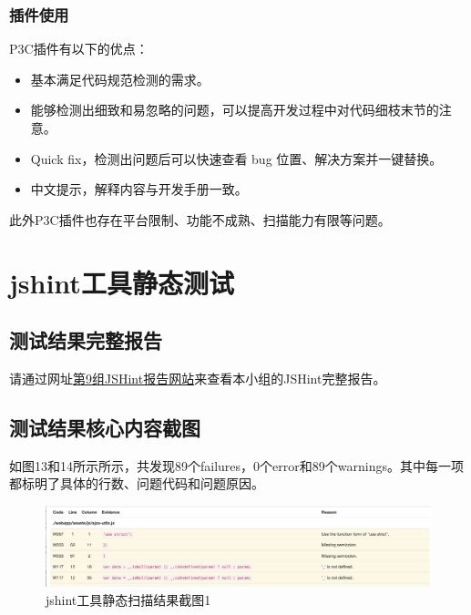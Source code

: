 \documentclass[hyperref, a4paper]{ctexart}
\providecommand{\tightlist}{%
  \setlength{\itemsep}{0pt}\setlength{\parskip}{0pt}}
\begin{document}
\hypertarget{ux63d2ux4ef6ux4f7fux7528}{%
\subsubsection{插件使用}\label{ux63d2ux4ef6ux4f7fux7528}}

P3C插件有以下的优点：

\begin{itemize}
\tightlist
\item
  基本满足代码规范检测的需求。
\item
  能够检测出细致和易忽略的问题，可以提高开发过程中对代码细枝末节的注意。
\item
  Quick fix，检测出问题后可以快速查看 bug 位置、解决方案并一键替换。
\item
  中文提示，解释内容与开发手册一致。
\end{itemize}

此外P3C插件也存在平台限制、功能不成熟、扫描能力有限等问题。

\hypertarget{jshintux5de5ux5177ux9759ux6001ux6d4bux8bd5}{%
\section{jshint工具静态测试}\label{jshintux5de5ux5177ux9759ux6001ux6d4bux8bd5}}

\hypertarget{ux6d4bux8bd5ux7ed3ux679cux5b8cux6574ux62a5ux544a-2}{%
\subsection{测试结果完整报告}\label{ux6d4bux8bd5ux7ed3ux679cux5b8cux6574ux62a5ux544a-2}}

请通过网址\href{https://straybird-atsh.github.io/SoftwareQA-Testing/JSHintReport.html}{第9组JSHint报告网站}来查看本小组的JSHint完整报告。

\hypertarget{ux6d4bux8bd5ux7ed3ux679cux6838ux5fc3ux5185ux5bb9ux622aux56fe-2}{%
\subsection{测试结果核心内容截图}\label{ux6d4bux8bd5ux7ed3ux679cux6838ux5fc3ux5185ux5bb9ux622aux56fe-2}}

如图13和14所示所示，共发现89个failures，0个error和89个warnings。其中每一项都标明了具体的行数、问题代码和问题原因。

\begin{figure}
\centering
\includegraphics{screenshots/pic3.jpg}
\caption{jshint工具静态扫描结果截图1}
\end{figure}
\end{document}
